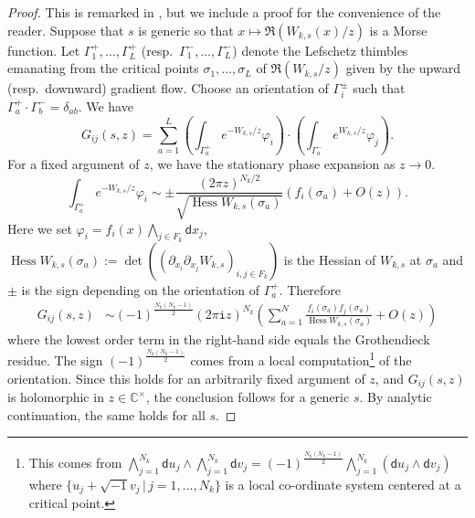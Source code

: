 \documentclass[11pt]{amsart}
\theoremstyle{definition} %
\theoremstyle{remark} %
\newcommand{\CC}{\mathbb C}
\newcommand{\Res}{\operatorname{Res}}
\newcommand{\dd}{\mathsf{d}}
\newcommand{\Hess}{\operatorname{Hess}}
\newcommand{\iu}{\mathtt{i}}
\begin{document}
\begin{proof} 
This is remarked in \cite[2\`{e}me Partie, \S 4.3, Remarque]{Pham:onglet}, 
but we include a proof 
for the convenience of the reader. 
Suppose that $s$ is generic so that $x\mapsto \Re(W_{k,s}(x)/z)$ 
is a Morse function. 
Let $\Gamma_1^+,\dots,\Gamma_L^+$ 
(resp.\ $\Gamma_1^-,\dots,\Gamma_L^-$) 
denote the Lefschetz thimbles emanating from the critical 
points $\sigma_1,\dots,\sigma_L$ of $\Re(W_{k,s}/z)$ 
given by the upward (resp.\ downward) 
gradient flow. Choose an orientation of $\Gamma_i^\pm$ such 
that $\Gamma_a^+ \cdot \Gamma_b^- = \delta_{ab}$. 
We have 
\[
G_{ij}(s,z) = \sum_{a=1}^L 
\left ( \int_{\Gamma_a^+} e^{-W_{k,s}/z} \varphi_i \right) 
\cdot 
\left( \int_{\Gamma_a^-} e^{W_{k,s}/z} \varphi_j \right). 
\]
For a fixed argument of $z$, we have the 
stationary phase expansion as $z\to 0$. 
\[
\int_{\Gamma_a^+} e^{-W_{k,s}/z} \varphi_i 
\sim 
\pm 
\frac{(2\pi z)^{N_k/2}}{\sqrt{\Hess W_{k,s}(\sigma_a)}} 
(f_i(\sigma_a) + O(z)).  
\]
Here we set $\varphi_i = f_i(x) 
\bigwedge_{j\in F_k} \dd x_{j}$, 
$\Hess W_{k,s}(\sigma_a):= \det \left (
(\partial_{x_{i}} \partial_{x_{j}} W_{k,s})_{i,j\in F_k}
\right)$ is the Hessian of $W_{k,s}$ 
at $\sigma_a$ and $\pm$ is the sign depending on the 
orientation of $\Gamma_a^+$. Therefore 
\begin{align*} 
G_{ij}(s,z) & \sim (-1)^{\frac{N_k(N_k-1)}{2}} (2\pi\iu z)^{N_k} 
\left ( \sum_{a=1}^N 
\frac{f_i(\sigma_a) f_j(\sigma_a)}{\Hess W_{k,s}(\sigma_a)} + O(z)
\right )  
\end{align*} 
where the lowest order term in the right-hand side 
equals the Grothendieck residue. 
The sign $(-1)^{\frac{N_k(N_k-1)}{2}}$ comes from 
a local computation\footnote
{This comes from 
$\bigwedge_{j=1}^{N_k} \dd u_j \wedge 
\bigwedge_{j=1}^{N_k} \dd v_j 
= (-1)^{\frac{N_k(N_k-1)}{2}} 
\bigwedge_{j=1}^{N_k} (\dd u_j\wedge \dd v_j)$ 
where $\{u_j + \sqrt{-1} v_j\,|\, j=1,\dots, N_k\}$ is a 
local co-ordinate system centered at a critical point.} 
of the orientation.  
Since this holds for an arbitrarily fixed argument 
of $z$, and $G_{ij}(s,z)$ is holomorphic 
in $z\in \CC^\times$, the conclusion follows 
for a generic $s$. By analytic continuation, 
the same holds for all $s$. 
\end{proof} 
\end{document}
